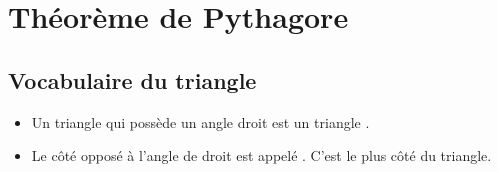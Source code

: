 \section{Théorème de Pythagore}
\subsection{Vocabulaire du triangle}
\begin{voc}
    \begin{itemize}
        \item Un triangle qui possède un angle droit est un triangle .
        \item Le côté opposé à l'angle de droit est appelé . C'est
            le plus  côté du triangle.
    \end{itemize}
\end{voc}
